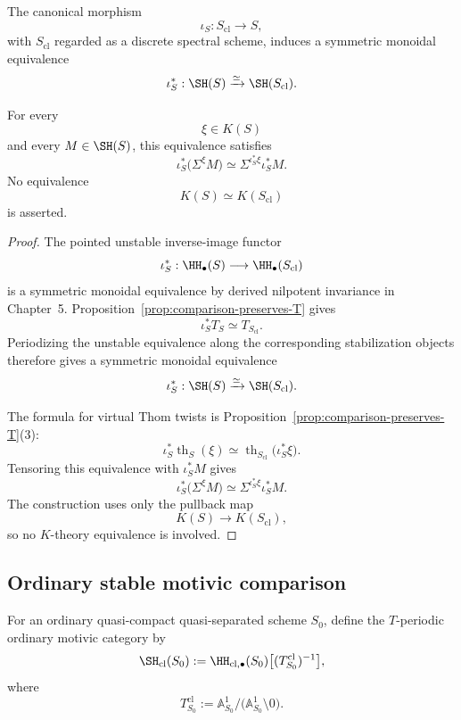 \begin{theorem}
\label{thm:stable-nil-invariance}
The canonical morphism
\[
    \iota_S:
    S_{\mathrm{cl}}
    \longrightarrow
    S,
\]
with \(S_{\mathrm{cl}}\) regarded as a discrete spectral scheme, induces a
symmetric monoidal equivalence
\[
    \iota_S^*:
    \SH(S)
    \xrightarrow{\simeq}
    \SH(S_{\mathrm{cl}}).
\]

For every
\[
    \xi\in K(S)
\]
and every \(M\in\SH(S)\), this equivalence satisfies
\[
    \iota_S^*
    \bigl(
      \Sigma^\xi M
    \bigr)
    \simeq
    \Sigma^{\iota_S^*\xi}
    \iota_S^*M.
\]
No equivalence
\[
    K(S)\simeq K(S_{\mathrm{cl}})
\]
is asserted.
\end{theorem}

\begin{proof}
The pointed unstable inverse-image functor
\[
    \iota_S^*:
    \HH_\bullet(S)
    \longrightarrow
    \HH_\bullet(S_{\mathrm{cl}})
\]
is a symmetric monoidal equivalence by derived nilpotent invariance in
Chapter~5.  Proposition~\ref{prop:comparison-preserves-T} gives
\[
    \iota_S^*T_S
    \simeq
    T_{S_{\mathrm{cl}}}.
\]
Periodizing the unstable equivalence along the corresponding stabilization
objects therefore gives a symmetric monoidal equivalence
\[
    \iota_S^*:
    \SH(S)
    \xrightarrow{\simeq}
    \SH(S_{\mathrm{cl}}).
\]

The formula for virtual Thom twists is
Proposition~\ref{prop:comparison-preserves-T}(3):
\[
    \iota_S^*
    \operatorname{th}_S(\xi)
    \simeq
    \operatorname{th}_{S_{\mathrm{cl}}}
    \bigl(
      \iota_S^*\xi
    \bigr).
\]
Tensoring this equivalence with \(\iota_S^*M\) gives
\[
    \iota_S^*
    \bigl(
      \Sigma^\xi M
    \bigr)
    \simeq
    \Sigma^{\iota_S^*\xi}
    \iota_S^*M.
\]
The construction uses only the pullback map
\[
    K(S)\longrightarrow K(S_{\mathrm{cl}}),
\]
so no \(K\)-theory equivalence is involved.
\end{proof}

\subsection{Ordinary stable motivic comparison}

\begin{definition}
\label{def:ordinary-SH}
For an ordinary quasi-compact quasi-separated scheme \(S_0\), define the
\(T\)-periodic ordinary motivic category by
\[
    \SH_{\mathrm{cl}}(S_0)
    :=
    \HH_{\mathrm{cl},\bullet}(S_0)
    \bigl[
      (T^{\mathrm{cl}}_{S_0})^{-1}
    \bigr],
\]
where
\[
    T^{\mathrm{cl}}_{S_0}
    :=
    \mathbb A^1_{S_0}/
    \bigl(
      \mathbb A^1_{S_0}\setminus0
    \bigr).
\]
\end{definition}

